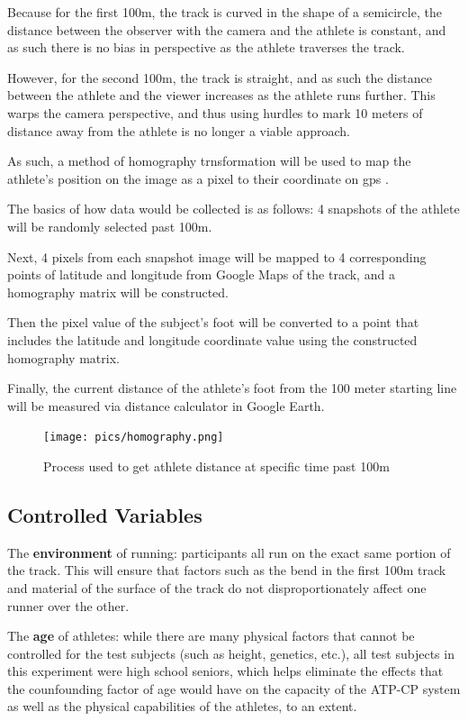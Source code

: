 \documentclass[index]{subfiles}
\begin{document}
Because for the first 100m, the track is curved in the shape of a semicircle, the distance between the observer with the camera and the athlete is constant, and as such there is no bias in perspective as the athlete traverses the track.

However, for the second 100m, the track is straight, and as such the distance between the athlete and the viewer increases as the athlete runs further. This warps the camera perspective, and thus using hurdles to mark 10 meters of distance away from the athlete is no longer a viable approach.

As such, a method of homography trnsformation will be used to map the athlete's position on the image as a pixel to their coordinate on gps \parencite{linMethodPerspectiveNormalization2020}.

The basics of how data would be collected is as follows: 4 snapshots of the athlete will be randomly selected past 100m.

Next, 4 pixels from each snapshot image will be mapped to 4 corresponding points of latitude and longitude from Google Maps of the track, and a homography matrix will be constructed.

Then the pixel value of the subject's foot will be converted to a point that includes the latitude and longitude coordinate value using the constructed homography matrix.

Finally, the current distance of the athlete's foot from the 100 meter starting line will be measured via distance calculator in Google Earth.

\begin{figure}[H]
    \centering
    \caption{Process used to get athlete distance at specific time past 100m}
    \texttt{[image: pics/homography.png]}
\end{figure}

\subsection{Controlled Variables}

The \textbf{environment} of running: participants all run on the exact same portion of the track. This will ensure that factors such as the bend in the first 100m track and material of the surface of the track do not disproportionately affect one runner over the other.

The \textbf{age} of athletes: while there are many physical factors that cannot be controlled for the test subjects (such as height, genetics, etc.), all test subjects in this experiment were high school seniors, which helps eliminate the effects that the counfounding factor of age would have on the capacity of the ATP-CP system as well as the physical capabilities of the athletes, to an extent.
\end{document}
